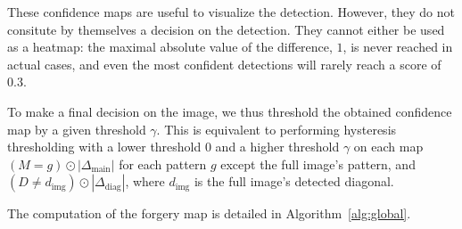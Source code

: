 \documentclass{ipol}
\begin{document}
These confidence maps are useful to visualize the detection. However, they do not consitute by themselves a decision on the detection. They cannot either be used as a heatmap: the maximal absolute value of the difference, $1$, is never reached in actual cases, and even the most confident detections will rarely reach a score of $0.3$. 

To make a final decision on the image, we thus threshold the obtained confidence map by a given threshold $\gamma$. This is equivalent to performing hysteresis thresholding with a lower threshold 0 and a higher threshold $\gamma$ on each map $(M=g)\odot |\Delta_{\mathrm{main}}|$ for each pattern $g$ except the full image's pattern, and $(D\neq d_{\mathrm{img}})\odot|\Delta_{\mathrm{diag}}|$, where $d_{\mathrm{img}}$ is the full image's detected diagonal.
       

The computation of the forgery map is detailed in Algorithm~\ref{alg:global}. 
\end{document}

